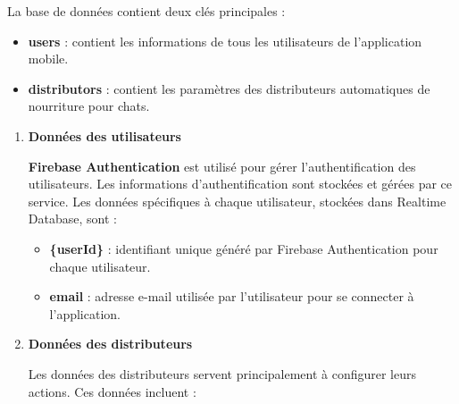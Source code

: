 La base de données contient deux clés principales :

\begin{itemize}
\item \textbf{users} : contient les informations de tous les utilisateurs de l'application mobile.
\item \textbf{distributors} : contient les paramètres des distributeurs automatiques de nourriture pour chats.
\end{itemize}

\begin{enumerate}[label=\alph*)]
\item \textbf{Données des utilisateurs} 

\textbf{Firebase Authentication} est utilisé pour gérer l'authentification des utilisateurs. Les informations d'authentification sont stockées et gérées par ce service. Les données spécifiques à chaque utilisateur, stockées dans Realtime Database, sont :

\begin{itemize}
\item \textbf{\{userId\}} : identifiant unique généré par Firebase Authentication pour chaque utilisateur.
\item \textbf{email} : adresse e-mail utilisée par l'utilisateur pour se connecter à l'application.
\end{itemize}

\item \textbf{Données des distributeurs} 

Les données des distributeurs servent principalement à configurer leurs actions. Ces données incluent :


\end{enumerate}
